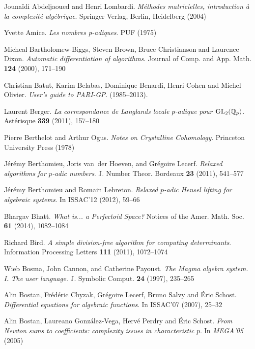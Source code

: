 \documentclass[11pt]{article}
\numberwithin{equation}{section}
\numberwithin{figure}{section}
\theoremstyle{definition}
\newcommand{\Q}{\mathbb Q}
\newcommand{\Qp}{\Q_p}
\newcommand{\GL}{\text{\rm GL}}
\begin{document}
\begin{thebibliography}{99}
\small
\renewcommand{\itemsep}{0pt}
  Jounaïdi Abdeljaoued and Henri Lombardi.
  \emph{Méthodes matricielles, introduction à la complexité algébrique}.
  Springer Verlag, Berlin, Heidelberg (2004)

  Yvette Amice.
  \emph{Les nombres p-adiques}.
  PUF (1975)

  Micheal Bartholomew-Biggs, Steven Brown, Bruce Christianson and Laurence Dixon.
  \emph{Automatic differentiation of algorithms}.
  Journal of Comp. and App. Math. \textbf{124} (2000), 171--190

  Christian Batut, Karim Belabas, Dominique Benardi, Henri Cohen and Michel Olivier.
  \emph{User's guide to {PARI-GP}}. {(1985--2013)}.

  Laurent Berger.
  \emph{La correspondance de Langlands locale $p$-adique pour $\GL_2(\Qp)$}.
  Astérisque \textbf{339} (2011), 157--180

  Pierre Berthelot and Arthur Ogus.
  \emph{Notes on Crystalline Cohomology}.
  Princeton University Press (1978)

  Jérémy Berthomieu, Joris van~der Hoeven, and Grégoire Lecerf.
  \emph{Relaxed algorithms for $p$-adic numbers}.
  {J. Number Theor. Bordeaux} \textbf{23} (2011), 541--577

  Jérémy Berthomieu and Romain Lebreton. 
  \emph{Relaxed $p$-adic Hensel lifting for algebraic systems}.
  In ISSAC'12 (2012), 59--66

  Bhargav Bhatt.
  \emph{What is... a Perfectoid Space?}
  Notices of the Amer. Math. Soc. \textbf{61} (2014), 1082--1084

  Richard Bird.
  \emph{A simple division-free algorithm for computing determinants}.
  Information Processing Letters \textbf{111} (2011), 1072--1074 

  Wieb Bosma, John Cannon, and Catherine Payoust.
  \emph{The Magma algebra system. I. The user language.}
  J. Symbolic Comput. \textbf{24} (1997), 235--265

  Alin Bostan, Frédéric Chyzak, Grégoire Lecerf, Bruno Salvy and Éric Schost.
  \emph{Differential equations for algebraic functions}.
  In ISSAC'07 (2007), 25--32

  Alin Bostan, Laureano Gonz{\'a}lez-Vega, Hervé Perdry and Éric Schost.
  \emph{From {N}ewton sums to coefficients: complexity issues in
  characteristic $p$}.
  In {\em {MEGA'05}} (2005)


\end{thebibliography}
\end{document}
